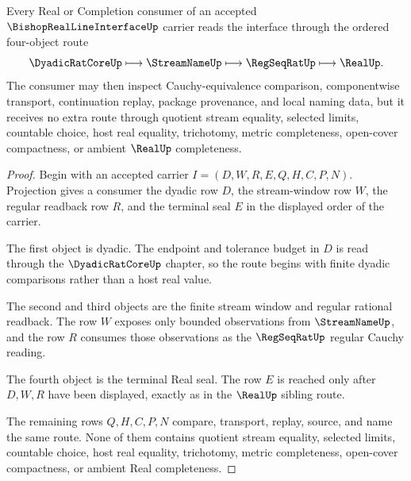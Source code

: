 \begin{theorem}
\label{thm:bishop-real-line-interface-four-object-route}
Every Real or Completion consumer of an accepted $\BishopRealLineInterfaceUp$ carrier reads the interface through the ordered four-object route
$$
\DyadicRatCoreUp \longmapsto \StreamNameUp \longmapsto \RegSeqRatUp \longmapsto \RealUp .
$$
The consumer may then inspect Cauchy-equivalence comparison, componentwise transport, continuation replay, package provenance, and local naming data, but it receives no extra route through quotient stream equality, selected limits, countable choice, host real equality, trichotomy, metric completeness, open-cover compactness, or ambient $\RealUp$ completeness.
\end{theorem}
\begin{proof}
Begin with an accepted carrier $I=(D,W,R,E,Q,H,C,P,N)$. Projection gives a consumer the dyadic row $D$, the stream-window row $W$, the regular readback row $R$, and the terminal seal $E$ in the displayed order of the carrier.

The first object is dyadic. The endpoint and tolerance budget in $D$ is read through the $\DyadicRatCoreUp$ chapter, so the route begins with finite dyadic comparisons rather than a host real value.

The second and third objects are the finite stream window and regular rational readback. The row $W$ exposes only bounded observations from $\StreamNameUp$, and the row $R$ consumes those observations as the $\RegSeqRatUp$ regular Cauchy reading.

The fourth object is the terminal Real seal. The row $E$ is reached only after $D,W,R$ have been displayed, exactly as in the $\RealUp$ sibling route.

The remaining rows $Q,H,C,P,N$ compare, transport, replay, source, and name the same route. None of them contains quotient stream equality, selected limits, countable choice, host real equality, trichotomy, metric completeness, open-cover compactness, or ambient Real completeness.
\end{proof}

